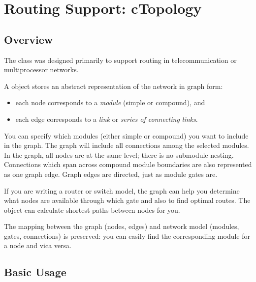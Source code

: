 

\section{Routing Support: cTopology}
\label{sec:sim-lib:ctopology}

\subsection{Overview}
\label{sec:sim-lib:ctopology-overview}

The  class was designed primarily to support
routing in telecommunication or multiprocessor
networks.

A  object stores an abstract representation of the
network in graph form:
\begin{itemize}
  \item{each  node corresponds to a \textit{module}
    (simple or compound), and}
  \item{each  edge corresponds to a \textit{link} or
    \textit{series of connecting links}.}
\end{itemize}

You can specify which modules (either simple or compound) you want to
include in the graph. The graph will include all connections among the
selected modules. In the graph, all nodes are at the same level;
there is no submodule nesting.  Connections which span across compound
module boundaries are also represented as one graph edge. Graph edges
are directed, just as module gates are.

If you are writing a router or switch model, the 
graph can help you determine what nodes are available through which
gate and also to find optimal routes. The
 object can calculate shortest paths between nodes for you.

The mapping between the graph (nodes, edges) and network model
(modules, gates, connections) is preserved: you can easily find
the corresponding module for a  node and vica versa.


\subsection{Basic Usage}
\label{sec:sim-lib:ctopology-basic-usage}


